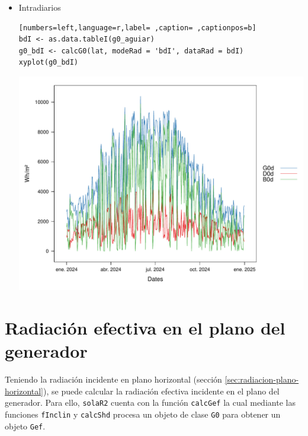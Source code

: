 \begin{itemize}
\item Intradiarios
\begin{lstlisting}[numbers=left,language=r,label= ,caption= ,captionpos=b]
bdI <- as.data.tableI(g0_aguiar)
g0_bdI <- calcG0(lat, modeRad = 'bdI', dataRad = bdI)
xyplot(g0_bdI)
\end{lstlisting}

\begin{center}
\includegraphics[width=\textwidth]{figuras/codigo-calcg0.pdf}
\end{center}
\end{itemize}

\section{Radiación efectiva en el plano del generador}
\label{sec:org91be8ba}
\label{sec:radiacion-efectiva-plano-generador}
Teniendo la radiación incidente en plano horizontal (sección \ref{sec:radiacion-plano-horizontal}), se puede calcular la radiación efectiva incidente en el plano del generador. Para ello, \texttt{solaR2} cuenta con la función \texttt{calcGef} la cual mediante las funciones \texttt{fInclin} y \texttt{calcShd} procesa un objeto de clase \texttt{G0} para obtener un objeto \texttt{Gef}.

